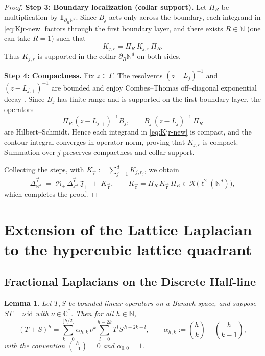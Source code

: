 \documentclass[10pt]{amsart}
\newcommand{\C}{{\mathbb{C}}}
\newcommand{\Z}{{\mathbb{Z}}}
\newcommand{\N}{{\mathbb{N}}}
\newcommand{\1}{{\mathbb{I}}}
\newcommand{\Kc}{\mathcal{K}}
\numberwithin{equation}{section}
\newtheorem{lemma}[theorem]{Lemma}%
\begin{document}
\begin{proof}
\medskip\noindent\textbf{Step 3: Boundary localization (collar support).}
Let $\Pi_R$ be multiplication by $\mathbf 1_{\partial_R\N^d}$. Since $B_j$ acts only across the boundary,
each integrand in \eqref{eq:Kjr-new} factors through the first boundary layer, and there exists $R\in\N$ (one can take $R=1$) such that
\[
K_{j,r}=\Pi_R\,K_{j,r}\,\Pi_R.
\]
Thus $K_{j,r}$ is supported in the collar $\partial_R\N^d$ on both sides.

\medskip\noindent\textbf{Step 4: Compactness.}
Fix $z\in\Gamma$. The resolvents $(z-L_j)^{-1}$ and $(z-L_{j,+})^{-1}$ are bounded and enjoy Combes--Thomas off--diagonal exponential decay \cite{CombesThomas1973}. Since $B_j$ has finite range and is supported on the first boundary layer, the operators
\[
\Pi_R\,(z-L_{j,+})^{-1} B_j,\qquad B_j\,(z-L_j)^{-1}\,\Pi_R
\]
are Hilbert--Schmidt. Hence each integrand in \eqref{eq:Kjr-new} is compact, and the contour integral converges in operator norm, proving that $K_{j,r}$ is compact. Summation over $j$ preserves compactness and collar support.

\medskip
Collecting the steps, with $K_{\vec{\mathrm{r}}}:=\sum_{j=1}^d K_{j,r_j}$, we obtain
\[
\Delta_{\N^d}^{\vec{\mathrm{r}}}
\;=\; \mathfrak R_+\, \Delta_{\Z^d}^{\vec{\mathrm{r}}}\, \mathfrak J_+ \;+\; K_{\vec{\mathrm{r}}},
\qquad
K_{\vec{\mathrm{r}}}=\Pi_R\,K_{\vec{\mathrm{r}}}\,\Pi_R\in\Kc\big(\ell^2(\N^d)\big),
\]
which completes the proof.
\end{proof}




\section{Extension of the Lattice Laplacian to the hypercubic lattice quadrant}
\label{half-plane}

\subsection{Fractional Laplacians on the Discrete Half-line}


\begin{lemma}
Let $T,S$ be bounded linear operators on a Banach space, and suppose $ST=\nu\,\mathrm{id}$ with $\nu\in\C^\ast$. Then for all $h\in\N$,
\[
(T+S)^h=\sum_{k=0}^{\lfloor h/2\rfloor}\alpha_{h,k}\,\nu^k\sum_{l=0}^{h-2k}T^l S^{\,h-2k-l},
\qquad
\alpha_{h,k}:=\binom{h}{k}-\binom{h}{k-1},
\]
with the convention $\binom{h}{-1}=0$ and $\alpha_{0,0}=1$.
\end{lemma}
\end{document}
